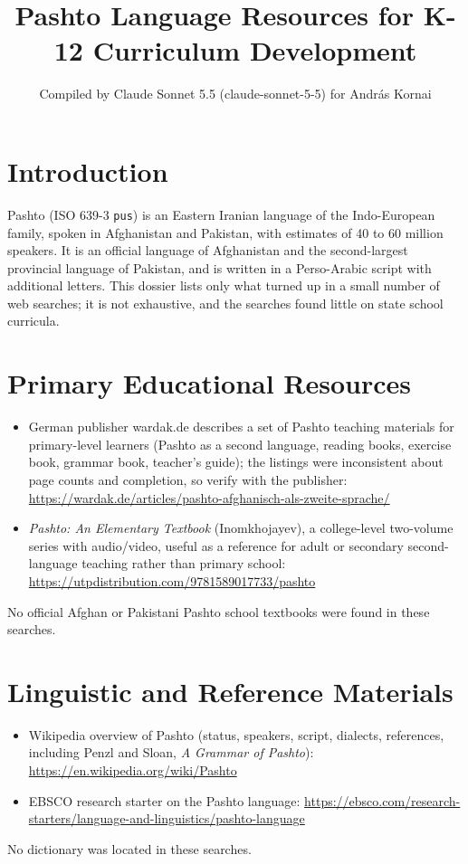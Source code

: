 \documentclass[12pt]{article}
\title{Pashto Language Resources for K-12 Curriculum Development}
\author{Compiled by Claude Sonnet 5.5 (claude-sonnet-5-5) for Andr\'as Kornai}
\date{}
\begin{document}
\maketitle

\section{Introduction}
Pashto (ISO 639-3 \texttt{pus}) is an Eastern Iranian language of the Indo-European family, spoken in Afghanistan and Pakistan, with estimates of 40 to 60 million speakers. It is an official language of Afghanistan and the second-largest provincial language of Pakistan, and is written in a Perso-Arabic script with additional letters. This dossier lists only what turned up in a small number of web searches; it is not exhaustive, and the searches found little on state school curricula.

\section{Primary Educational Resources}
\begin{itemize}
\item German publisher wardak.de describes a set of Pashto teaching materials for primary-level learners (Pashto as a second language, reading books, exercise book, grammar book, teacher's guide); the listings were inconsistent about page counts and completion, so verify with the publisher: \url{https://wardak.de/articles/pashto-afghanisch-als-zweite-sprache/}
\item \emph{Pashto: An Elementary Textbook} (Inomkhojayev), a college-level two-volume series with audio/video, useful as a reference for adult or secondary second-language teaching rather than primary school: \url{https://utpdistribution.com/9781589017733/pashto}
\end{itemize}
No official Afghan or Pakistani Pashto school textbooks were found in these searches.

\section{Linguistic and Reference Materials}
\begin{itemize}
\item Wikipedia overview of Pashto (status, speakers, script, dialects, references, including Penzl and Sloan, \emph{A Grammar of Pashto}): \url{https://en.wikipedia.org/wiki/Pashto}
\item EBSCO research starter on the Pashto language: \url{https://ebsco.com/research-starters/language-and-linguistics/pashto-language}
\end{itemize}
No dictionary was located in these searches.
\end{document}
